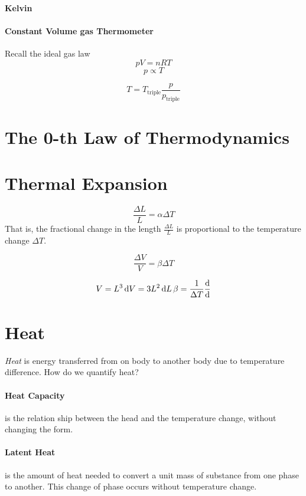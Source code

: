 \documentclass{note}
\begin{document}
\paragraph{Kelvin}

\paragraph{Constant Volume gas Thermometer}

Recall the ideal gas law
\[
  pV = nRT
\]
\[
  p \propto T
\]

\[
  T = T_\text{triple}\frac{p}{p_\text{triple}}
\]

\section{The 0-th Law of Thermodynamics}


\section{Thermal Expansion}

\[
  \frac{\Delta L}{L} = \alpha \Delta T
\]
That is, the fractional change in the length \(\frac{\Delta L}{L}\) is proportional to the temperature change \(\Delta T\).

\[
  \frac{\Delta V}{V} = \beta \Delta T
\]

\begin{align*}
  V = L^3
  \dd{V} = 3L^2 \dd{L}
  \beta = \frac{1}{\Delta T}\dv{}{}
\end{align*}

\section{Heat}

\textit{Heat} is energy transferred from on body to another body due to temperature difference. How do we quantify heat?

\paragraph{Heat Capacity} is the relation ship between the head and the temperature change, without changing the form.

\paragraph{Latent Heat} is the amount of heat needed to convert a unit mass of substance from one phase to another. This change of phase occurs without temperature change.
\end{document}
